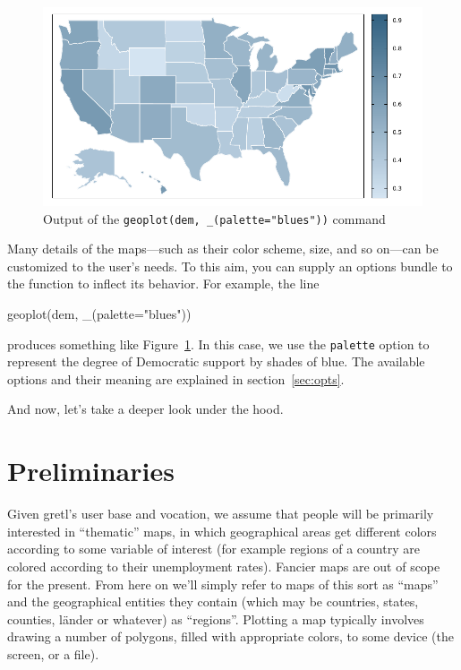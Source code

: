 \documentclass{article}
\begin{document}
\begin{figure}[htbp]
  \centering
  \includegraphics[scale=0.75]{us2020-dem}
  \caption{Output of the \texttt{geoplot(dem, \_(palette="blues"))} command}
  \label{fig:us2020-dem}
\end{figure}

Many details of the maps---such as their color scheme, size, and so
on---can be customized to the user's needs. To this aim, you can
supply an options bundle to the  function to inflect
its behavior. For example, the line
\begin{code}
  geoplot(dem, _(palette="blues"))
\end{code}
produces something like Figure~\ref{fig:us2020-dem}. In this case, we
use the \texttt{palette} option to represent the degree of Democratic
support by shades of blue. The available options and their meaning are
explained in section~\ref{sec:opts}.

And now, let's take a deeper look under the hood.

\section{Preliminaries}
\label{sec:prelim}

Given gretl's user base and vocation, we assume that people will be
primarily interested in ``thematic'' maps, in which geographical areas
get different colors according to some variable of interest (for
example regions of a country are colored according to their
unemployment rates). Fancier maps are out of scope for the
present. From here on we'll simply refer to maps of this sort as
``maps'' and the geographical entities they contain (which may be
countries, states, counties, l\"ander or whatever) as
``regions''. Plotting a map typically involves drawing a number of
polygons, filled with appropriate colors, to some device (the screen,
or a file).
\end{document}
